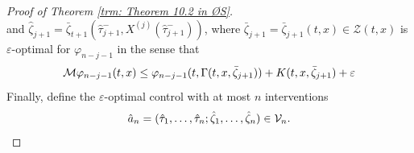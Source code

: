 \begin{proof}[Proof of Theorem \ref{trm: Theorem 10.2 in ØS}]
\begin{equation}
        \label{eqn: (10.1.32) in ØS}
    \end{equation}
    and $\hat{\zeta}_{j+1} = \bar{\zeta}_{t+1}(\hat{\tau}_{j+1}^-, X^{(j)}(\hat{\tau}_{j+1}^-))$, where $\bar{\zeta}_{j+1} = \bar{\zeta}_{j+1}(t,x) \in \mathcal{Z}(t,x)$ is $\varepsilon$-optimal for $\varphi_{n-j-1}$ in the sense that 
    \begin{equation}
        \mathcal{M} \varphi_{n-j-1}(t,x) \leq \varphi_{n-j-1}(t,\Gamma(t,x, \bar{\zeta}_{j+1})) + K(t,x,\bar{\zeta}_{j+1}) + \varepsilon
        \label{eqn: (10.1.33) in ØS}
    \end{equation}
    Finally, define the $\varepsilon$-optimal control with at most $n$ interventions
    \begin{equation*}
        \hat{a}_n = (\hat{\tau}_1, \ldots, \hat{\tau}_n; \hat{\zeta}_1, \ldots, \hat{\zeta}_n) \in \mathcal{V}_n. 
    \end{equation*}


\end{proof}
